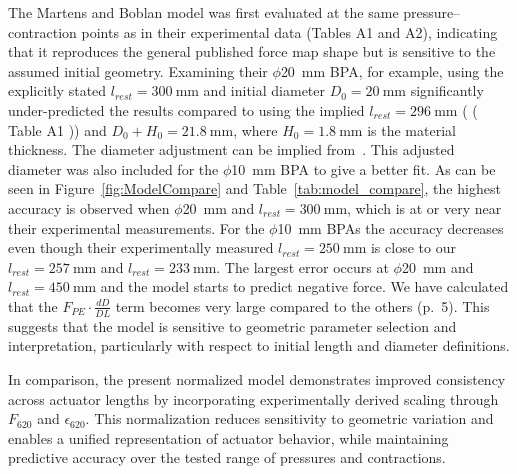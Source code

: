 \documentclass[actuators,article,accept,pdftex,moreauthors]{Definitions/mdpi}
\begin{document}
The Martens and Boblan model was first evaluated at the same pressure–contraction points as in their experimental data \citep{martens_modeling_2017} {(Tables A1 and  A2),} %
 indicating that it reproduces the general published force map shape but is sensitive to the assumed initial geometry. %
  Examining their $\phi$\qty{20}{\mm} BPA, for example, using the explicitly stated $l_{rest}=\qty{300}{\mm}$ and initial diameter $D_{0}=\qty{20}{\mm}$ significantly under-predicted the results compared to using the implied $l_{rest}=\qty{296}{\mm}$ (\citep{martens_modeling_2017} {(}%
{Table A1}%
)) and $D_{0}+H_{0}=\qty{21.8}{\mm}$, where $H_{0}=\qty{1.8}{\mm}$ is the material thickness. The diameter adjustment can be implied \mbox{from \citep{chou_measurement_1996}.} This adjusted diameter was also included for the $\phi$\qty{10}{\mm} BPA to give a better fit. As can be seen in Figure~\ref{fig:ModelCompare} and Table~\ref{tab:model_compare}, the highest accuracy is observed when $\phi$\qty{20}{\mm} and $l_{rest}=\qty{300}{\mm}$, which is at or very near their experimental measurements. For the $\phi$\qty{10}{\mm} BPAs the accuracy decreases even though their experimentally measured $l_{rest}=\qty{250}{\mm}$ is close to our $l_{rest}=\qty{257}{\mm}$ and $l_{rest}=\qty{233}{\mm}$. The largest error occurs at $\phi$\qty{20}{\mm} and $l_{rest}=\qty{450}{\mm}$ and the model starts to predict negative force. We have calculated that the $F_{PE}\cdot\frac{dD}{DL}$ term becomes very large compared to the others \citep{martens_modeling_2017} (p.~5). This suggests that the model is sensitive to geometric parameter selection and interpretation, particularly with respect to initial length and diameter definitions.

In comparison, the present normalized model demonstrates improved consistency across actuator lengths by incorporating experimentally derived scaling through $F_{620}$ and $\epsilon_{620}$. This normalization reduces sensitivity to geometric variation and enables a unified representation of actuator behavior, while maintaining predictive accuracy over the tested range of pressures and contractions.
\end{document}
